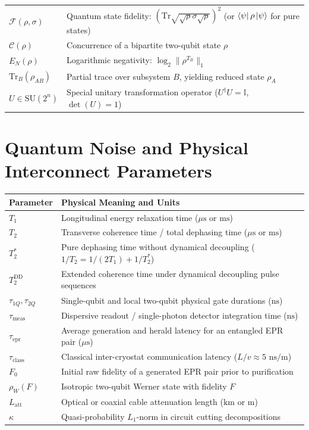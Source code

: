 \begin{tabularx}{\textwidth}{lX}
    $\mathcal{F}(\rho, \sigma)$ & Quantum state fidelity: $(\text{Tr}\sqrt{\sqrt{\rho}\sigma\sqrt{\rho}})^2$ (or $\bra{\psi}\rho\ket{\psi}$ for pure states) \\
    $\mathcal{C}(\rho)$ & Concurrence of a bipartite two-qubit state $\rho$ \\
    $E_N(\rho)$ & Logarithmic negativity: $\log_2 \|\rho^{T_B}\|_1$ \\
    $\text{Tr}_B(\rho_{AB})$ & Partial trace over subsystem $B$, yielding reduced state $\rho_A$ \\
    $U \in \text{SU}(2^n)$ & Special unitary transformation operator ($U^\dagger U = \mathbb{I}$, $\det(U) = 1$) \\
    \bottomrule
\end{tabularx}

\section*{Quantum Noise and Physical Interconnect Parameters}

\begin{tabularx}{\textwidth}{lX}
    \toprule
    \textbf{Parameter} & \textbf{Physical Meaning and Units} \\
    \midrule
    $T_1$ & Longitudinal energy relaxation time ($\mu\text{s}$ or $\text{ms}$) \\
    $T_2$ & Transverse coherence time / total dephasing time ($\mu\text{s}$ or $\text{ms}$) \\
    $T_2^*$ & Pure dephasing time without dynamical decoupling ($1/T_2 = 1/(2T_1) + 1/T_2^*$) \\
    $T_2^{\text{DD}}$ & Extended coherence time under dynamical decoupling pulse sequences \\
    $\tau_{1Q}, \tau_{2Q}$ & Single-qubit and local two-qubit physical gate durations ($\text{ns}$) \\
    $\tau_{\text{meas}}$ & Dispersive readout / single-photon detector integration time ($\text{ns}$) \\
    $\tau_{\text{epr}}$ & Average generation and herald latency for an entangled EPR pair ($\mu\text{s}$) \\
    $\tau_{\text{class}}$ & Classical inter-cryostat communication latency ($L/v \approx 5\text{ ns/m}$) \\
    $F_0$ & Initial raw fidelity of a generated EPR pair prior to purification \\
    $\rho_W(F)$ & Isotropic two-qubit Werner state with fidelity $F$ \\
    $L_{\text{att}}$ & Optical or coaxial cable attenuation length ($\text{km}$ or $\text{m}$) \\
    $\kappa$ & Quasi-probability $L_1$-norm in circuit cutting decompositions \\
    \bottomrule
\end{tabularx}

